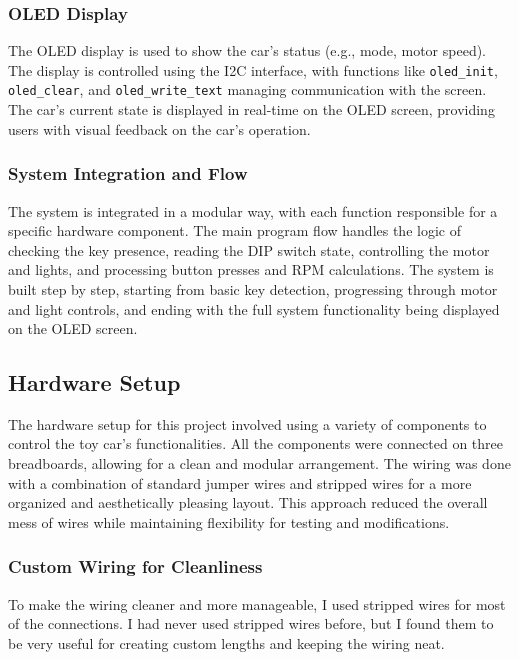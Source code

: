 \subsubsection{OLED Display}
The OLED display is used to show the car's status (e.g., mode, motor speed). The display is controlled using the I2C interface, with functions like \texttt{oled\_init}, \texttt{oled\_clear}, and \texttt{oled\_write\_text} managing communication with the screen. The car's current state is displayed in real-time on the OLED screen, providing users with visual feedback on the car's operation.

\subsubsection{System Integration and Flow}
The system is integrated in a modular way, with each function responsible for a specific hardware component. The main program flow handles the logic of checking the key presence, reading the DIP switch state, controlling the motor and lights, and processing button presses and RPM calculations. The system is built step by step, starting from basic key detection, progressing through motor and light controls, and ending with the full system functionality being displayed on the OLED screen.

\subsection{Hardware Setup}
The hardware setup for this project involved using a variety of components to control the toy car's functionalities. All the components were connected on three breadboards, allowing for a clean and modular arrangement. The wiring was done with a combination of standard jumper wires and stripped wires for a more organized and aesthetically pleasing layout. This approach reduced the overall mess of wires while maintaining flexibility for testing and modifications.

\subsubsection{Custom Wiring for Cleanliness}
To make the wiring cleaner and more manageable, I used stripped wires for most of the connections. I had never used stripped wires before, but I found them to be very useful for creating custom lengths and keeping the wiring neat.

\newpage